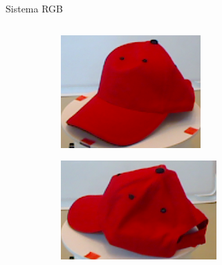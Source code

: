 \documentclass[]{beamer}
\begin{document}
\begin{frame}[fragile]{Sistema RGB}
\begin{columns}
\begin{column}{0.6\textwidth}
{                \begin{figure}
                	\centering
                	\begin{subfigure}[b]{0.4\textwidth}
                		\includegraphics[width=\textwidth]{img/templates/0_crop.png}
                	\end{subfigure}
                	\quad
                	\begin{subfigure}[b]{0.4\textwidth}
                		\includegraphics[width=\textwidth]{img/templates/90_crop.png}
                	\end{subfigure}


\end{figure}}
\end{column}
\end{columns}
\end{frame}
\end{document}
